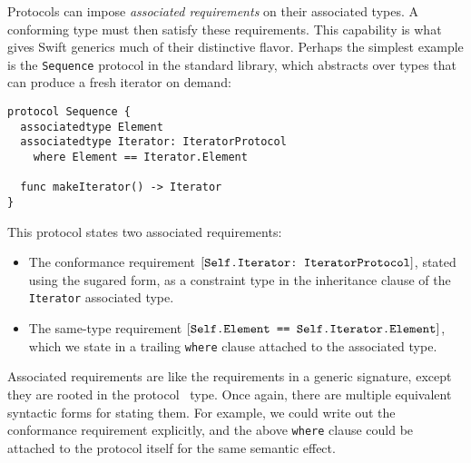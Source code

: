 \documentclass[../generics]{subfiles}
\begin{document}
Protocols can impose \emph{associated requirements} on their associated types. A conforming type must then satisfy these requirements. This capability is what gives Swift generics much of their distinctive flavor. Perhaps the simplest example is the \texttt{Sequence} protocol in the standard library, which abstracts over types that can produce a fresh iterator on demand:
\begin{Verbatim}
protocol Sequence {
  associatedtype Element
  associatedtype Iterator: IteratorProtocol
    where Element == Iterator.Element

  func makeIterator() -> Iterator
}
\end{Verbatim}
This protocol states two associated requirements:
\begin{itemize}
\item The conformance requirement $[\texttt{Self.Iterator:~IteratorProtocol}]$, stated using the sugared form, as a constraint type in the inheritance clause of the \texttt{Iterator} associated type.
\item The same-type requirement $[\texttt{Self.Element == Self.Iterator.Element}]$, which we state in a trailing \texttt{where} clause attached to the associated type.
\end{itemize}
Associated requirements are like the requirements in a generic signature, except they are rooted in the \IndexSelf protocol \tSelf\ type. Once again, there are multiple equivalent syntactic forms for stating them. For example, we could write out the conformance requirement explicitly, and the above \texttt{where} clause could be attached to the protocol itself for the same semantic effect.
\end{document}
